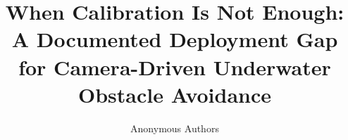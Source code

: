 \documentclass[runningheads]{llncs}
\begin{document}
\title{When Calibration Is Not Enough: A Documented Deployment Gap for
Camera-Driven Underwater Obstacle Avoidance}


\author{Anonymous Authors}
\institute{}

\maketitle
















\end{document}
